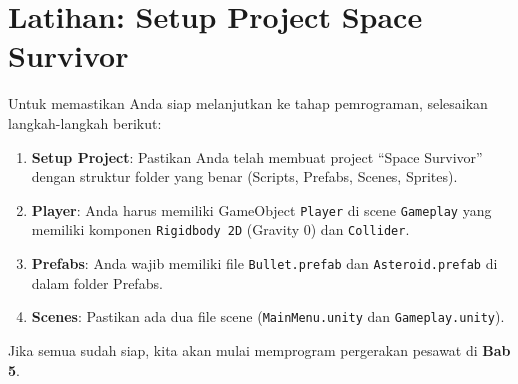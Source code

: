 
\section{Latihan: Setup Project Space Survivor}

Untuk memastikan Anda siap melanjutkan ke tahap pemrograman, selesaikan langkah-langkah berikut:

\begin{enumerate}
    \item \textbf{Setup Project}: Pastikan Anda telah membuat project ``Space Survivor'' dengan struktur folder yang benar (Scripts, Prefabs, Scenes, Sprites).
    \item \textbf{Player}: Anda harus memiliki GameObject \texttt{Player} di scene \texttt{Gameplay} yang memiliki komponen \texttt{Rigidbody 2D} (Gravity 0) dan \texttt{Collider}.
    \item \textbf{Prefabs}: Anda wajib memiliki file \texttt{Bullet.prefab} dan \texttt{Asteroid.prefab} di dalam folder Prefabs.
    \item \textbf{Scenes}: Pastikan ada dua file scene (\texttt{MainMenu.unity} dan \texttt{Gameplay.unity}).
\end{enumerate}

Jika semua sudah siap, kita akan mulai memprogram pergerakan pesawat di \textbf{Bab 5}.
